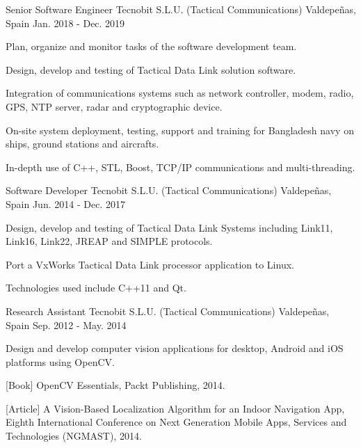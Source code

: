 \begin{cventries}
  \cventry
    {Senior Software Engineer} %
    {Tecnobit S.L.U. (Tactical Communications)} %
    {Valdepeñas, Spain} %
    {Jan. 2018 - Dec. 2019} %
    {
      \begin{cvitems} %
        \item {Plan, organize and monitor tasks of the software development team.}
        \item {Design, develop and testing of Tactical Data Link solution software.}
        \item {Integration of communications systems such as network controller, modem, radio, GPS, NTP server, radar and cryptographic device.}
        \item {On-site system deployment, testing, support and training for Bangladesh navy on ships, ground stations and aircrafts.}
        \item {In-depth use of C++, STL, Boost, TCP/IP communications and multi-threading.}
      \end{cvitems}
    }

  \cventry
    {Software Developer} %
    {Tecnobit S.L.U. (Tactical Communications)} %
    {Valdepeñas, Spain} %
    {Jun. 2014 - Dec. 2017} %
    {
      \begin{cvitems} %
        \item {Design, develop and testing of Tactical Data Link Systems including Link11, Link16, Link22, JREAP and SIMPLE protocols.}
        \item {Port a VxWorks Tactical Data Link processor application to Linux.}
        \item {Technologies used include C++11 and Qt.}
      \end{cvitems}
    }


  \cventry
    {Research Assistant} %
    {Tecnobit S.L.U. (Tactical Communications)} %
    {Valdepeñas, Spain} %
    {Sep. 2012 - May. 2014} %
    {
      \begin{cvitems} %
        \item {Design and develop computer vision applications for desktop, Android and iOS platforms using OpenCV.}
        \item {[Book] OpenCV Essentials, Packt Publishing, 2014.}
        \item {[Article] A Vision-Based Localization Algorithm for an Indoor Navigation App, Eighth International Conference on Next Generation Mobile Apps, Services and Technologies (NGMAST), 2014.}
      \end{cvitems}
    }




\end{cventries}

